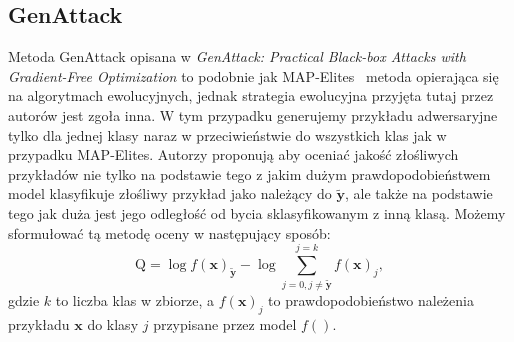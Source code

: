 \documentclass[
    left=2.5cm,         %
    right=2.5cm,        %
    top=2.5cm,          %
    bottom=3cm,         %
    bindingoffset=6mm,  %
    nohyphenation=false %
]{eiti/eiti-thesis}
\renewcommand{\vec}[1]{\mathbf{#1}}
\begin{document}
\subsection{GenAttack}
Metoda GenAttack opisana w \textit{GenAttack: Practical Black-box Attacks with Gradient-Free Optimization}\cite{DBLP:journals/corr/abs-1805-11090}
to podobnie jak MAP-Elites~\cite{DBLP:journals/corr/NguyenYC14} metoda opierająca się na algorytmach ewolucyjnych, jednak strategia ewolucyjna
przyjęta tutaj przez autorów jest zgoła inna. W tym przypadku generujemy przykładu adwersaryjne tylko dla jednej klasy naraz
w przeciwieństwie do wszystkich klas jak w przypadku MAP-Elites.
Autorzy proponują aby oceniać jakość złośliwych przykładów nie tylko na podstawie tego z jakim dużym prawdopodobieństwem
model klasyfikuje złośliwy przykład jako należący do \(\vec{\widetilde{y}}\), ale także na podstawie tego jak duża jest jego
odległość od bycia sklasyfikowanym z inną klasą.
Możemy sformułować tą metodę oceny w następujący sposób:
\begin{equation}
    \text{Q} = \log{f(\vec{x})}_{\vec{\widetilde{y}}} - \log\sum^{j=k}_{j=0,j\neq \vec{\widetilde{y}}} f(\vec{x})_j,
\end{equation}
gdzie \(k\) to liczba klas w zbiorze, a \(f(\vec{x})_j\) to prawdopodobieństwo należenia przykładu \(\vec{x}\) do klasy \(j\) przypisane przez model \(f()\).
\end{document}
